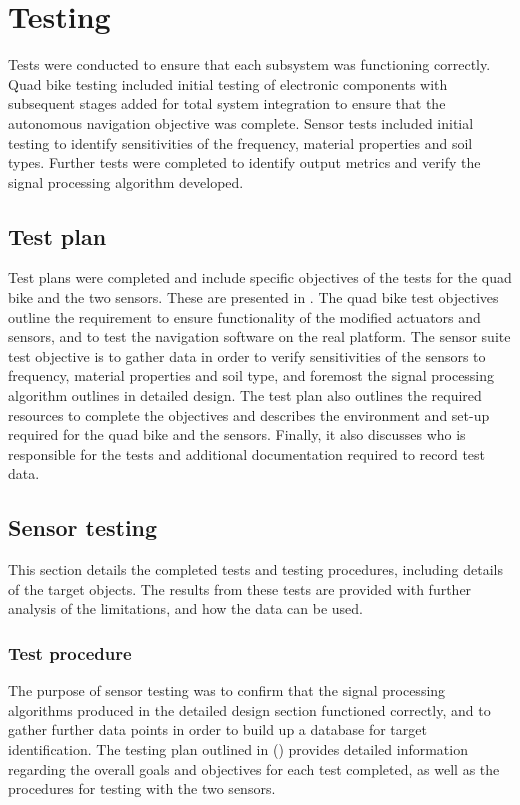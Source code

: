 \documentclass[main.tex]{subfiles}
\begin{document}
\chapter{Testing}
Tests were conducted to ensure that each subsystem was functioning correctly. Quad bike testing included initial testing of electronic components with subsequent stages added for total system integration to ensure that the autonomous navigation objective was complete. Sensor tests included initial testing to identify sensitivities of the frequency, material properties and soil types. Further tests were completed to identify output metrics and verify the signal processing algorithm developed. 

\section{Test plan}
Test plans were completed and include specific objectives of the tests for the quad bike and the two sensors. These are presented in . The quad bike test objectives outline the requirement to ensure functionality of the modified actuators and sensors, and to test the navigation software on the real platform. The sensor suite test objective is to gather data in order to verify sensitivities of the sensors to frequency, material properties and soil type, and foremost the signal processing algorithm outlines in detailed design. The test plan also outlines the required resources to complete the objectives and describes the environment and set-up required for the quad bike and the sensors. Finally, it also discusses who is responsible for the tests and additional documentation required to record test data. 

\section{Sensor testing}
This section details the completed tests and testing procedures, including details of the target objects. The results from these tests are provided with further analysis of the limitations, and how the data can be used. 

\subsection{Test procedure}
The purpose of sensor testing was to confirm that the signal processing algorithms produced in the detailed design section functioned correctly, and to gather further data points in order to build up a database for target identification. The testing plan outlined in () provides detailed information regarding the overall goals and objectives for each test completed, as well as the procedures for testing with the two sensors. 
\end{document}
